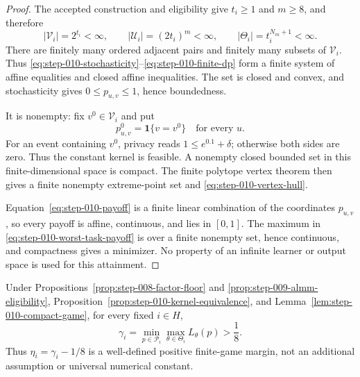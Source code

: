\begin{proof}
The accepted construction and eligibility give \(t_i\ge1\) and \(m\ge8\),
and therefore
\begin{equation}\label{eq:step-010-cardinalities}
|\mathcal V_i|=2^{t_i}<\infty,
\qquad
|\mathcal U_i|=(2t_i)^m<\infty,
\qquad
|\Theta_i|=t_i^{N_m+1}<\infty.
\end{equation}
There are finitely many ordered adjacent pairs and finitely many subsets of
\(\mathcal V_i\).  Thus
\eqref{eq:step-010-stochasticity}--\eqref{eq:step-010-finite-dp} form a
finite system of affine equalities and closed affine inequalities.  The
set is closed and convex, and stochasticity gives
\(0\le p_{u,v}\le1\), hence boundedness.

It is nonempty: fix \(v^0\in\mathcal V_i\) and put
\begin{equation}\label{eq:step-010-constant-kernel}
p^0_{u,v}=\mathbf1\{v=v^0\}
\quad\text{for every }u.
\end{equation}
For an event containing \(v^0\), privacy reads
\(1\le e^{0.1}+\delta\); otherwise both sides are zero.  Thus the
constant kernel is feasible.  A nonempty closed bounded set in this
finite-dimensional space is compact.  The finite polytope vertex theorem
then gives a finite nonempty extreme-point set and
\eqref{eq:step-010-vertex-hull}.

Equation~\eqref{eq:step-010-payoff} is a finite linear combination of the
coordinates \(p_{u,v}\), so every payoff is affine, continuous, and lies
in \([0,1]\).  The maximum in
\eqref{eq:step-010-worst-task-payoff} is over a finite nonempty set, hence
continuous, and compactness gives a minimizer.  No property of an infinite
learner or output space is used for this attainment.
\end{proof}

\begin{proposition}
\label{prop:step-010-strict-value}
Under Propositions~\ref{prop:step-008-factor-floor} and
\ref{prop:step-009-almm-eligibility},
Proposition~\ref{prop:step-010-kernel-equivalence}, and
Lemma~\ref{lem:step-010-compact-game}, for every fixed \(i\in H\),
\begin{equation}\label{eq:step-010-strict-value}
\gamma_i
=\min_{p\in\mathcal P_i}\max_{\theta\in\Theta_i}L_\theta(p)
>\frac18.
\end{equation}
Thus \(\eta_i=\gamma_i-1/8\) is a well-defined positive finite-game
margin, not an additional assumption or universal numerical constant.
\end{proposition}

